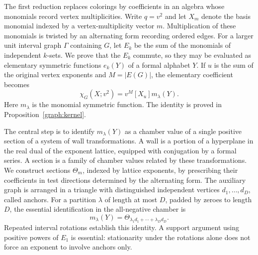 The first reduction replaces colorings by coefficients in an algebra
whose monomials record vertex multiplicities. Write $q=v^2$ and let
$X_m$ denote the basis monomial indexed by a vertex-multiplicity
vector $m$.  Multiplication of these monomials is
twisted by an alternating form recording ordered edges. For a larger unit
interval graph $\Gamma$ containing $G$, let $E_k$ be the sum of the
monomials of independent $k$-sets. We prove that the $E_k$ commute, so
they may be evaluated as elementary symmetric functions $e_k(Y)$ of a
formal alphabet $Y$. If $u$ is the sum of the original vertex exponents
and $M=|E(G)|$, the elementary coefficient becomes
\begin{equation}
 [e_\lambda(X)]\chi_G(X;v^2)
       =v^M[X_u]m_\lambda(Y).
 \label{main:reduction}
\end{equation}
Here $m_\lambda$ is the monomial symmetric function. The identity is
proved in Proposition~\ref{graph:kernel}.

The central step is to identify $m_\lambda(Y)$ as a chamber value of a
single positive section of a system of wall transformations. A wall is
a portion of a hyperplane in the real dual of the exponent lattice,
equipped with conjugation by a formal series. A section is a family of
chamber values related by these transformations. We construct sections $\Theta_m$,
indexed by lattice exponents, by prescribing their coefficients in test
directions determined by the alternating form. The auxiliary graph is
arranged in a triangle with distinguished independent vertices
$d_1,\ldots,d_D$, called anchors. For a partition $\lambda$ of length
at most $D$, padded by zeroes to length $D$, the essential identification in the all-negative chamber is
\begin{equation}
 m_\lambda(Y)=\Theta_{\lambda_1d_1+\cdots+\lambda_Dd_D}.
 \label{main:identification}
\end{equation}
Repeated interval rotations establish this identity. A support argument
using positive powers of $E_1$ is essential: stationarity under the
rotations alone does not force an exponent to involve anchors only.

